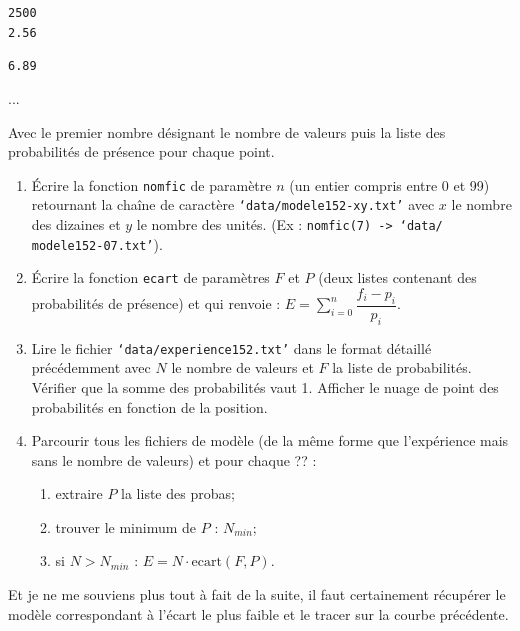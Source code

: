 \documentclass[10pt,fleqn]{article} %
\begin{document}
\begin{multicols}{2}
\texttt{2500}\\

\texttt{2.56}

\texttt{6.89}

...

Avec le premier nombre désignant le nombre de valeurs puis la liste des probabilités de présence pour chaque point.
\begin{enumerate}
\item Écrire la fonction \texttt{nomfic} de paramètre $n$ (un entier compris entre 0 et 99) retournant la chaîne de caractère \texttt{`data/modele152-xy.txt'} avec $x$ le nombre des dizaines et $y$ le nombre des unités. (Ex : \texttt{nomfic(7) -> ‘data/ modele152-07.txt’}).

\item Écrire la fonction \texttt{ecart} de paramètres $F$ et $P$ (deux listes contenant des probabilités de présence) et qui renvoie : $E=\sum\limits_{i=0}^{n}\dfrac{f_i-p_i}{p_i}$.


\item Lire le fichier \texttt{‘data/experience152.txt’} dans le format détaillé précédemment avec $N$ le nombre de valeurs et $F$ la liste de probabilités.
Vérifier que la somme des probabilités vaut 1.
Afficher le nuage de point des probabilités en fonction de la position.
\item Parcourir tous les fichiers de modèle (de la même forme que l’expérience mais sans le nombre de valeurs) et pour chaque ?? :
\begin{enumerate}
\item extraire $P$ la liste des probas;
\item trouver le minimum de $P$ : $N_{min}$;
\item si $N>N_{min}$ : $E=N\cdot \text{ecart}(F,P)$.
\end{enumerate}
\end{enumerate}

Et je ne me souviens plus tout à fait de la suite, il faut certainement récupérer le modèle correspondant à l’écart le plus faible et le tracer sur la courbe précédente.



%
%




\end{multicols}
\end{document}
